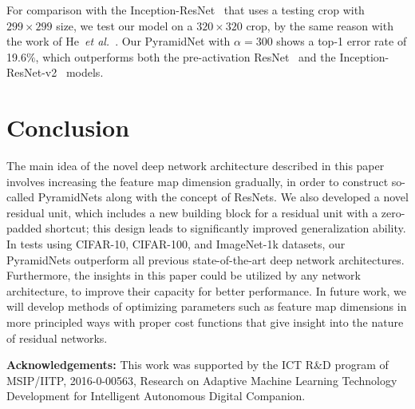 \documentclass[10pt,twocolumn,letterpaper]{article}
\begin{document}
For comparison with the Inception-ResNet~\cite{InceptionResnet} that uses a testing crop with $299\times 299$ size, we test our model on a $320\times 320$ crop, by the same reason with the work of He~{\it et al.}~\cite{preresnet}. Our PyramidNet with $\alpha=300$ shows a top-1 error rate of 19.6$\%$, which outperforms both the pre-activation ResNet~\cite{preresnet} and the Inception-ResNet-v2~\cite{InceptionResnet} models.
\section{Conclusion}
The main idea of the novel deep network architecture described in this paper involves increasing the feature map dimension gradually, in order to construct so-called PyramidNets along with the concept of ResNets. We also developed a novel residual unit, which includes a new building block for a residual unit with a zero-padded shortcut; this design leads to significantly improved generalization ability. In tests using CIFAR-10, CIFAR-100, and ImageNet-1k datasets, our PyramidNets outperform all previous state-of-the-art deep network architectures. Furthermore, the insights in this paper could be utilized by any network architecture, to improve their capacity for better performance. In future work, we will develop methods of optimizing parameters such as feature map dimensions in more principled ways with proper cost functions that give insight into the nature of residual networks.
\label{sec:conclusion}

{\noindent  \bf Acknowledgements:}
{
This work was supported by the ICT R\&D program of MSIP/IITP, 2016-0-00563, Research on Adaptive Machine Learning Technology Development for Intelligent Autonomous Digital Companion.
}

{\small


}
\end{document}
